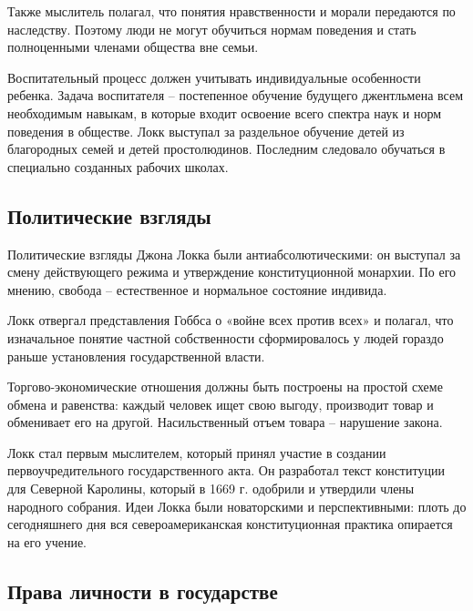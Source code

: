 \documentclass[
]{article}
\begin{document}
Также мыслитель полагал, что понятия нравственности и морали передаются
по наследству. Поэтому люди не могут обучиться нормам поведения и стать
полноценными членами общества вне семьи.

Воспитательный процесс должен учитывать индивидуальные особенности
ребенка. Задача воспитателя -- постепенное обучение будущего джентльмена
всем необходимым навыкам, в которые входит освоение всего спектра наук и
норм поведения в обществе. Локк выступал за раздельное обучение детей из
благородных семей и детей простолюдинов. Последним следовало обучаться в
специально созданных рабочих школах.

\hypertarget{ux43fux43eux43bux438ux442ux438ux447ux435ux441ux43aux438ux435-ux432ux437ux433ux43bux44fux434ux44b}{%
\subsection{Политические
взгляды}\label{ux43fux43eux43bux438ux442ux438ux447ux435ux441ux43aux438ux435-ux432ux437ux433ux43bux44fux434ux44b}}

Политические взгляды Джона Локка были антиабсолютическими: он выступал
за смену действующего режима и утверждение конституционной монархии. По
его мнению, свобода -- естественное и нормальное состояние индивида.

Локк отвергал представления Гоббса о «войне всех против всех» и полагал,
что изначальное понятие частной собственности сформировалось у людей
гораздо раньше установления государственной власти.

Торгово-экономические отношения должны быть построены на простой схеме
обмена и равенства: каждый человек ищет свою выгоду, производит товар и
обменивает его на другой. Насильственный отъем товара -- нарушение
закона.

Локк стал первым мыслителем, который принял участие в создании
первоучредительного государственного акта. Он разработал текст
конституции для Северной Каролины, который в 1669 г. одобрили и
утвердили члены народного собрания. Идеи Локка были новаторскими и
перспективными: плоть до сегодняшнего дня вся североамериканская
конституционная практика опирается на его учение.

\hypertarget{ux43fux440ux430ux432ux430-ux43bux438ux447ux43dux43eux441ux442ux438-ux432-ux433ux43eux441ux443ux434ux430ux440ux441ux442ux432ux435}{%
\subsection{Права личности в
государстве}\label{ux43fux440ux430ux432ux430-ux43bux438ux447ux43dux43eux441ux442ux438-ux432-ux433ux43eux441ux443ux434ux430ux440ux441ux442ux432ux435}}
\end{document}

